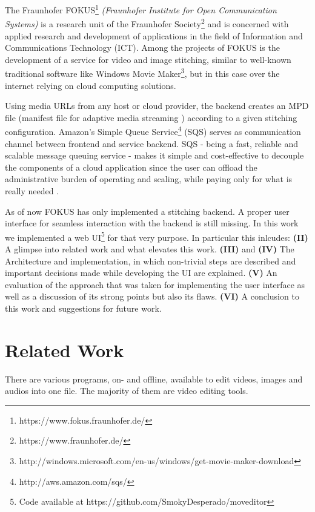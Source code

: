 \documentclass[conference]{IEEEtran}
\begin{document}
The Fraunhofer FOKUS\footnote{https://www.fokus.fraunhofer.de/} \textit{(Fraunhofer Institute for Open Communication Systems)} is a research unit of the Fraunhofer Society\footnote{https://www.fraunhofer.de/} and is concerned with applied research and development of applications in the field of Information and Communications Technology (ICT).
Among the projects of FOKUS is the development of a service for video and image stitching, similar to well-known traditional software like Windows Movie Maker\footnote{http://windows.microsoft.com/en-us/windows/get-movie-maker-download}, but in this case over the internet relying on cloud computing solutions.

Using media URLs from any host or cloud provider, the backend creates an MPD file (manifest file for adaptive media streaming \cite{Sodagar}) according to a given stitching configuration.
Amazon's Simple Queue Service\footnote{http://aws.amazon.com/sqs/} (SQS) serves as communication channel between frontend and service backend.
SQS - being a fast, reliable and scalable message queuing service - makes it simple and cost-effective to decouple the components of a cloud application since the user can offload the administrative burden of operating and scaling, while paying only for what is really needed \cite{VS}.

As of now FOKUS has only implemented a stitching backend. A proper user interface for seamless interaction with the backend is still missing.
In this work we implemented a web UI\footnote{Code available at https://github.com/SmokyDesperado/moveditor} for that very purpose.
In particular this inlcudes:
\textbf{(II)} A glimpse into related work and what elevates this work.
\textbf{(III)} and \textbf{(IV)} The Architecture and implementation, in which non-trivial steps are described and important decisions made while developing the UI are explained.
\textbf{(V)} An evaluation of the approach that was taken for implementing the user interface as well as a discussion of its strong points but also its flaws.
\textbf{(VI)} A conclusion to this work and suggestions for future work.

\section{Related Work}
There are various programs, on- and offline, available to edit videos, images and audios into one file.
The majority of them are video editing tools.
\end{document}
